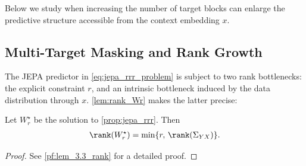 

Below we study when increasing the number of target blocks can enlarge the predictive structure accessible from the context embedding $x$.

\subsection{Multi-Target Masking and Rank Growth}
\label{sec:multi_target}

The JEPA predictor in \eqref{eq:jepa_rrr_problem} is subject to two rank bottlenecks: the explicit constraint $r$, and an intrinsic bottleneck induced by the data distribution through $x$. 
\cref{lem:rank_Wr} makes the latter precise:

\begin{lemma}
\label{lem:rank_Wr}
Let $W_r^\star$ be the solution to \cref{prop:jepa_rrr}. 
Then
\begin{align}
    \rank(W_r^\star)
    =
    \min\{r,\,\rank(\Sigma_{YX})\}.
    \label{eq:rank_Wr_star}
\end{align}
\end{lemma}
\begin{proof}
See \cref{pf:lem_3.3_rank} for a detailed proof.
\end{proof}

